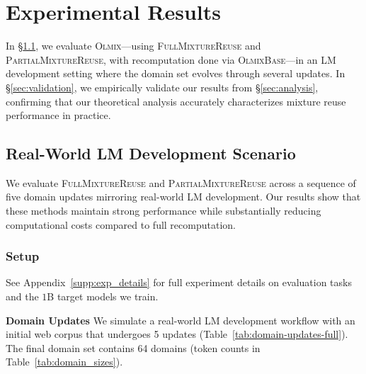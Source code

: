 \documentclass[table]{ai2style/ai2}
\newcommand{\olmix}{\textsc{Olmix}\xspace}
\newcommand{\base}[0]{\textsc{OlmixBase}\xspace}
\newcommand{\fullmixreuse}[0]{\textsc{FullMixtureReuse}\xspace}
\newcommand{\partialmixreuse}[0]{\textsc{PartialMixtureReuse}\xspace}
\begin{document}
\section{Experimental Results}\label{sec:results}

In \S\ref{sec:superswarm}, we evaluate \olmix---using \fullmixreuse and \partialmixreuse, with recomputation done via \base---in an LM development setting where the domain set evolves through several updates. In \S\ref{sec:validation}, we empirically validate our results from \S\ref{sec:analysis}, confirming that our theoretical analysis accurately characterizes mixture reuse performance in practice.

\subsection{Real-World LM Development Scenario}\label{sec:superswarm}

We evaluate \fullmixreuse and \partialmixreuse across a sequence of five domain updates mirroring real-world LM development. Our results show that these methods maintain strong performance while substantially reducing computational costs compared to full recomputation.

\subsubsection{Setup}

See Appendix~\ref{supp:exp_details} for full experiment details on evaluation tasks and the $1$B target models we train.

\textbf{Domain Updates} We simulate a real-world LM development workflow with an initial web corpus that undergoes 5 updates (Table~\ref{tab:domain-updates-full}). 
The final domain set contains 64 domains (token counts in Table~\ref{tab:domain_sizes}).
\end{document}
